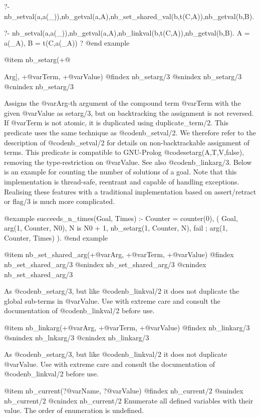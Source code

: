 {{{{{{?- nb_setval(a,a(_)),nb_getval(a,A),nb_set_shared_val(b,t(C,A)),nb_getval(b,B).

?- nb_setval(a,a(_)),nb_getval(a,A),nb_linkval(b,t(C,A)),nb_getval(b,B).
A = a(_A),
B = t(C,a(_A)) ?
@end example

@item nb_setarg(+@{Arg], +@var{Term}, +@var{Value})
@findex nb_setarg/3
@snindex nb_setarg/3
@cnindex nb_setarg/3

Assigns the @var{Arg}-th argument of the compound term @var{Term} with
the given @var{Value} as setarg/3, but on backtracking the assignment
is not reversed. If @var{Term} is not atomic, it is duplicated using
duplicate_term/2. This predicate uses the same technique as
@code{nb_setval/2}. We therefore refer to the description of
@code{nb_setval/2} for details on non-backtrackable assignment of
terms. This predicate is compatible to GNU-Prolog
@code{setarg(A,T,V,false)}, removing the type-restriction on
@var{Value}. See also @code{nb_linkarg/3}. Below is an example for
counting the number of solutions of a goal. Note that this
implementation is thread-safe, reentrant and capable of handling
exceptions. Realising these features with a traditional implementation
based on assert/retract or flag/3 is much more complicated.

@example
    succeeds_n_times(Goal, Times) :-
            Counter = counter(0),
            (   Goal,
                arg(1, Counter, N0),
                N is N0 + 1,
                nb_setarg(1, Counter, N),
                fail
            ;   arg(1, Counter, Times)
            ).
@end example

@item nb_set_shared_arg(+@var{Arg}, +@var{Term}, +@var{Value}) 
@findex nb_set_shared_arg/3
@snindex nb_set_shared_arg/3
@cnindex nb_set_shared_arg/3

As @code{nb_setarg/3}, but like @code{nb_linkval/2} it does not
duplicate the global sub-terms in @var{Value}. Use with extreme care
and consult the documentation of @code{nb_linkval/2} before use.

@item nb_linkarg(+@var{Arg}, +@var{Term}, +@var{Value}) 
@findex nb_linkarg/3
@snindex nb_lnkarg/3
@cnindex nb_linkarg/3

As @code{nb_setarg/3}, but like @code{nb_linkval/2} it does not
duplicate @var{Value}. Use with extreme care and consult the
documentation of @code{nb_linkval/2} before use.


@item nb_current(?@var{Name}, ?@var{Value}) 
@findex nb_current/2
@snindex nb_current/2
@cnindex nb_current/2
Enumerate all defined variables with their value. The order of
enumeration is undefined. 

}}}}}}}
